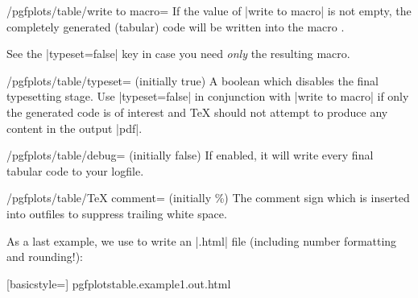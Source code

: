 
\begin{key}{/pgfplots/table/write to macro=}
    If the value of |write to macro| is not empty, the completely generated
    (tabular) code will be written into the macro .

    See the |typeset=false| key in case you need \emph{only} the resulting
    macro.
\end{key}


\begin{key}{/pgfplots/table/typeset= (initially true)}
    A boolean which disables the final typesetting stage. Use |typeset=false|
    in conjunction with |write to macro| if only the generated code is of
    interest and \TeX{} should not attempt to produce any content in the output
    |pdf|.
\end{key}

\begin{key}{/pgfplots/table/debug= (initially false)}
    If enabled, it will write every final tabular code to your logfile.
\end{key}

\begin{key}{/pgfplots/table/TeX comment= (initially \%)}
    The comment sign which is inserted into outfiles to suppress trailing white
    space.
\end{key}

\noindent As a last example, we use \PGFPlotstable{} to write an |.html| file
(including number formatting and rounding!):
%
\begin{codeexample}[pre={\begin{lateximage}},post={\end{lateximage}},width=8cm]

    [basicstyle=\ttfamily\footnotesize]
    {pgfplotstable.example1.out.html}
\end{codeexample}


